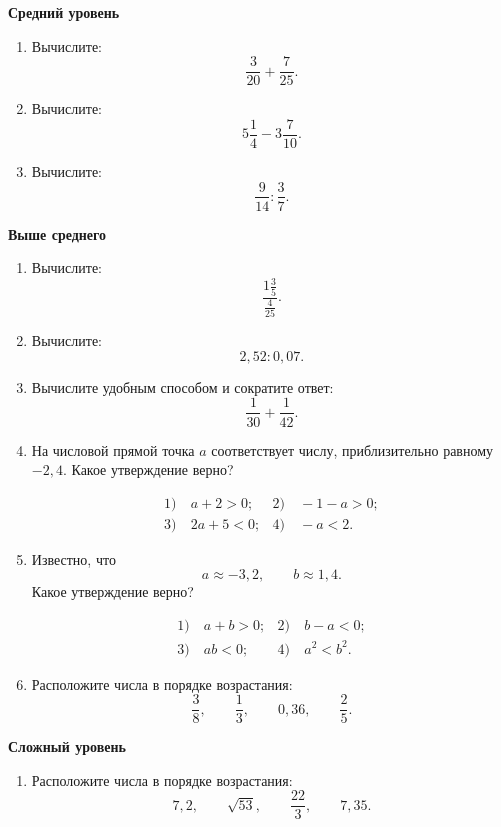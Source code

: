 \documentclass[a4paper,12pt]{article}
\begin{document}
\vspace{0.35cm}

{\small

\textbf{Средний уровень}

\begin{enumerate}[itemsep=0.55em,topsep=0.3em]

  \item
  Вычислите:
  \[
  \frac{3}{20}+\frac{7}{25}.
  \]

  \item
  Вычислите:
  \[
  5\frac14-3\frac{7}{10}.
  \]

  \item
  Вычислите:
  \[
  \frac{9}{14}:\frac{3}{7}.
  \]

\end{enumerate}

\textbf{Выше среднего}

\begin{enumerate}[resume,itemsep=0.6em,topsep=0.3em]

  \item
  Вычислите:
  \[
  \frac{1\frac35}{\frac{4}{25}}.
  \]

  \item
  Вычислите:
  \[
  2{,}52:0{,}07.
  \]

  \item
  Вычислите удобным способом и сократите ответ:
  \[
  \frac{1}{30}+\frac{1}{42}.
  \]

  \item
  На числовой прямой точка \(a\) соответствует числу,
  приблизительно равному \(-2{,}4\).
  Какое утверждение верно?

  \[
  \begin{aligned}
  1)&\ a+2>0; &
  2)&\ -1-a>0;\\
  3)&\ 2a+5<0; &
  4)&\ -a<2.
  \end{aligned}
  \]

  \item
  Известно, что
  \[
  a\approx-3{,}2,
  \qquad
  b\approx1{,}4.
  \]
  Какое утверждение верно?

  \[
  \begin{aligned}
  1)&\ a+b>0; &
  2)&\ b-a<0;\\
  3)&\ ab<0; &
  4)&\ a^2<b^2.
  \end{aligned}
  \]

  \item
  Расположите числа в порядке возрастания:
  \[
  \frac38,
  \qquad
  \frac13,
  \qquad
  0{,}36,
  \qquad
  \frac25.
  \]

\end{enumerate}

\textbf{Сложный уровень}

\begin{enumerate}[resume,itemsep=0.5em,topsep=0.3em]

  \item
  Расположите числа в порядке возрастания:
  \[
  7{,}2,
  \qquad
  \sqrt{53},
  \qquad
  \frac{22}{3},
  \qquad
  7{,}35.
  \]

\end{enumerate}

}
\end{document}
